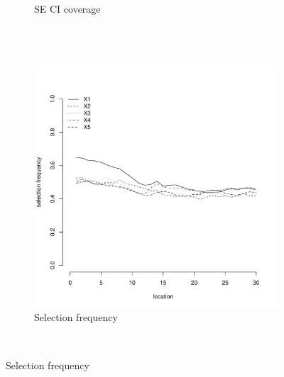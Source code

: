 \documentclass[authoryear, review, 11pt]{elsarticle}
\begin{document}
\begin{figure}
\begin{subfigure}[b]{0.45\textwidth}
		\caption{SE CI coverage}
	\end{subfigure}%
	\\%
	~ %
	\begin{subfigure}[b]{0.45\textwidth}
	\centering
		\includegraphics[width=\textwidth]{../../figures/simulation/15.34.profile_selection.pdf}
		\caption{Selection frequency}
	\end{subfigure}
	~ %

\end{figure}
\end{document}

